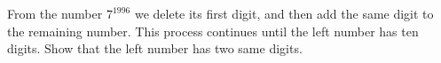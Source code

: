 From the number $7^{1996}$ we delete its first digit, and then add the same digit to the remaining number. This process continues until the left number has ten digits. Show that the left number has two same digits.